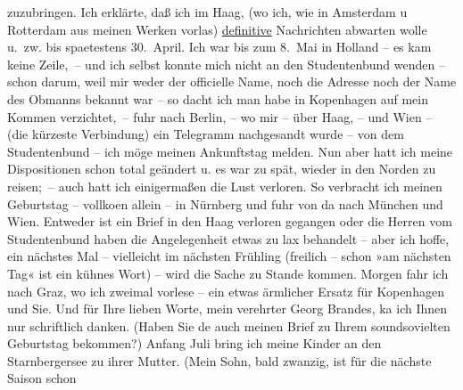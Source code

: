 \begin{ledgroupsized}[t]{13cm}
               zuzubringen. Ich erklärte, daß ich im Haag, (wo
                    ich, wie in Amsterdam u Rotterdam aus meinen Werken vorlas) \uline{definitive}{ } Nachrichten abwarten wolle u. zw. bis
                    spaetestens 30. April. Ich war bis zum 8. Mai in Holland – es kam keine Zeile, – und ich
                    selbst konnte mich nicht an den Studentenbund wenden – schon darum, weil mir
                    weder der officielle Name, noch die Adresse noch der Name des Obmanns {\pb}bekannt war – so dacht ich man habe in Kopenhagen auf mein Kommen verzichtet, – fuhr
               nach Berlin, – wo mir – über Haag, – und Wien – (die
                    kürzeste Verbindung) ein Telegramm nachgesandt wurde – von dem Studentenbund –
                    ich möge meinen Ankunftstag melden. Nun aber hatt ich meine Dispositionen schon
                    total geändert u. es war zu spät, wieder in den Norden zu reisen; – auch hatt
                    ich einigermaßen die Lust verloren. So verbracht ich meinen Geburtstag –
                        vollko{\geminationm}en allein – in Nürnberg und fuhr von da nach München und Wien. Entweder
               ist ein Brief in den Haag verloren gegangen
                    oder die Herren vom Studentenbund haben die Angelegenheit etwas zu lax behandelt
                    – aber ich hoffe, ein nächstes Mal – vielleicht im nächsten Frühling (freilich –
                    schon »am nächsten Tag« ist ein kühnes Wort) – wird die Sache zu Stande kommen.
                        {\pb}Morgen fahr ich nach Graz, wo ich zweimal vorlese – ein etwas ärmlicher Ersatz
                    für Kopenhagen und Sie.\pend
           \pstart
           Und für Ihre lieben Worte, mein verehrter Georg Brandes, ka{\geminationn} ich Ihnen nur schriftlich danken. (Haben Sie
                        de{\geminationn} auch meinen Brief zu Ihrem soundsovielten
                    Geburtstag bekommen?)\pend
           \pstart
           Anfang Juli bring ich meine Kinder an den Starnbergersee zu ihrer Mutter. (Mein Sohn, bald zwanzig, ist für die nächste Saison schon

\end{ledgroupsized}

